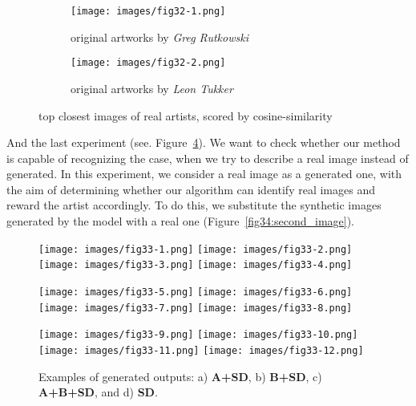 \documentclass[12pt, letterpaper]{article}
\begin{document}
\begin{figure}[h]
    \centering
    \begin{subfigure}{0.48\textwidth}
        \centering
        \texttt{[image: images/fig32-1.png]}
        \caption{original artworks by \textit{Greg Rutkowski}}
        \label{fig32:first_image}
    \end{subfigure}
    \begin{subfigure}{0.48\textwidth}
        \centering
        \texttt{[image: images/fig32-2.png]}
        \caption{original artworks by \textit{Leon Tukker}}
        \label{fig32:second_image}
    \end{subfigure}
    \caption{top closest images of real artists, scored by cosine-similarity}
    \label{fig32:all_images}    
\end{figure}

And the last experiment (see. Figure~\ref{fig33:all_images}). We want to check whether our method is capable of recognizing the case, when we try to describe a real image instead of generated.
In this experiment, we consider a real image as a generated one, with the aim of determining whether our algorithm can identify real images and reward the artist accordingly. To do this, we substitute the synthetic images generated by the model with a real one (Figure~\ref{fig34:second_image}).

\setlength{\belowcaptionskip}{-10pt}
\begin{figure}[h]
    \centering
    \begin{minipage}{\textwidth}
        \centering
        \texttt{[image: images/fig33-1.png]}
        \texttt{[image: images/fig33-2.png]}
        \texttt{[image: images/fig33-3.png]}
        \texttt{[image: images/fig33-4.png]}
        \label{fig33:row_a}
    \end{minipage}
    \begin{minipage}{\textwidth}
        \centering
        \texttt{[image: images/fig33-5.png]}
        \texttt{[image: images/fig33-6.png]}
        \texttt{[image: images/fig33-7.png]}
        \texttt{[image: images/fig33-8.png]}
        \label{fig33:row_b}
    \end{minipage}
    \begin{minipage}{\textwidth}
        \centering
        \texttt{[image: images/fig33-9.png]}
        \texttt{[image: images/fig33-10.png]}
        \texttt{[image: images/fig33-11.png]}
        \texttt{[image: images/fig33-12.png]}
        \label{fig33:row_c}
    \end{minipage}
    \caption{Examples of generated outputs: a) \textbf{A+SD}, b) \textbf{B+SD}, c) \textbf{A+B+SD}, and d) \textbf{SD}.}
    \label{fig33:all_images}
\end{figure}
\end{document}
